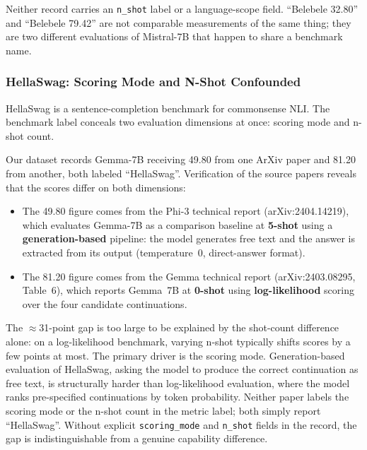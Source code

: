 \documentclass[11pt]{article}
\begin{document}
Neither record carries an \texttt{n\_shot} label or a language-scope field.
``Belebele 32.80'' and ``Belebele 79.42'' are not comparable measurements of
the same thing; they are two different evaluations of Mistral-7B that happen
to share a benchmark name.

\subsubsection{HellaSwag: Scoring Mode and N-Shot Confounded}
\label{sec:hellaswag}

HellaSwag is a sentence-completion benchmark for commonsense NLI. The benchmark
label conceals two evaluation dimensions at once: scoring mode and n-shot count.

Our dataset records Gemma-7B receiving 49.80 from one ArXiv paper and 81.20
from another, both labeled ``HellaSwag''. Verification of the source papers
reveals that the scores differ on both dimensions:

\begin{itemize}
  \item The 49.80 figure comes from the Phi-3 technical report
    \citep{abdin2024phi3} (arXiv:2404.14219), which evaluates Gemma-7B as a
    comparison baseline at \textbf{5-shot} using a \textbf{generation-based}
    pipeline: the model generates free text and the answer is extracted from
    its output (temperature~0, direct-answer format).
  \item The 81.20 figure comes from the Gemma technical report
    \citep{gemmateam2024gemma} (arXiv:2403.08295, Table~6), which reports
    Gemma~7B at \textbf{0-shot} using \textbf{log-likelihood} scoring over
    the four candidate continuations.
\end{itemize}

The $\approx$31-point gap is too large to be explained by the shot-count
difference alone: on a log-likelihood benchmark, varying n-shot typically shifts
scores by a few points at most. The primary driver is the scoring mode.
Generation-based evaluation of HellaSwag, asking the model to produce the
correct continuation as free text, is structurally harder than log-likelihood
evaluation, where the model ranks pre-specified continuations by token
probability. Neither paper labels the scoring mode or the n-shot count in the
metric label; both simply report ``HellaSwag''. Without explicit
\texttt{scoring\_mode} and \texttt{n\_shot} fields in the record, the gap is
indistinguishable from a genuine capability difference.
\end{document}
